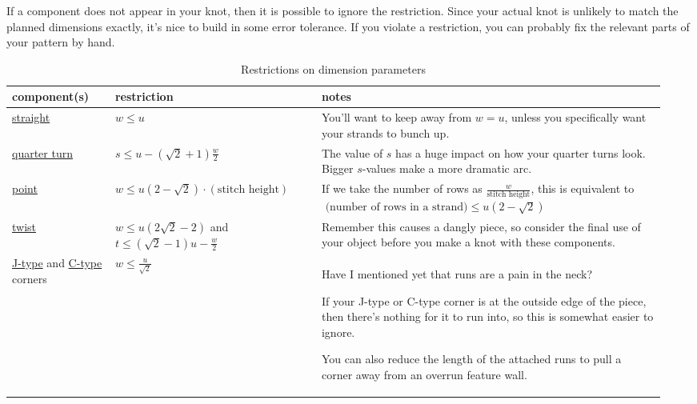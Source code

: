 \documentclass[openany]{book}
\begin{document}
If a component does not appear in your knot, then it is possible to ignore the restriction. Since your actual knot is unlikely to match the planned dimensions exactly, it's nice to build in some error tolerance. If you violate a restriction, you can probably fix the relevant parts of your pattern by hand.
\begin{table}[H]
\centering
{\renewcommand{\arraystretch}{1.2}
\begin{tabular}{|m{0.15\linewidth} |  m{0.3\linewidth} | m{0.5\linewidth} | }
\hline 
component(s) & restriction & notes\\ \hline
\hyperref[sssec:straight]{straight} &\centering $w\le u$ & You'll want to keep away from $w=u$, unless you specifically want your strands to bunch up.\\ \hline
\hyperref[sssec:quarter]{quarter turn} &\centering  $s  \leq u - (\sqrt2+1)\frac{w}{2}$ & The value of $s$ has a huge impact on how your quarter turns look. Bigger $s$-values make a more dramatic arc.\\ \hline
\hyperref[sssec:point]{point} & \centering $w \le u \left(2-\sqrt 2\right)\cdot(\text{stitch height})$
&
If we take the number of rows as $\frac{w}{\text{stitch height}}$, this is equivalent to 
 $\text{ (number of rows in a strand)} \le u\left(2-\sqrt 2\right) $
 \\\hline
\hyperref[sssec:twist]{twist} &\centering  ${ w  \leq u\left(2\sqrt 2 - 2\right)}$ and 
${t\leq\left(\sqrt 2 - 1\right)u-\frac{w}{2}}$ & Remember this causes a dangly piece, so consider the final use of your object before you make a knot with these components.  \\ \hline
\raggedright
\hyperref[sssec:j]{J-type} and \linebreak\hyperref[sssec:c]{C-type} corners & \centering $w  \leq \frac{u}{\sqrt 2}$  & Have I mentioned yet that runs are a pain in the neck?\medskip

 If your J-type or C-type corner is at the outside edge of the piece, then there's nothing for it to run into, so this is somewhat easier to ignore.\medskip 

You can also reduce the length of the attached runs to pull a corner away from an overrun feature wall. \\ \hline
\end{tabular}}
\caption{Restrictions on dimension parameters}\label{table:restrictions}
\end{table}%
\end{document}
